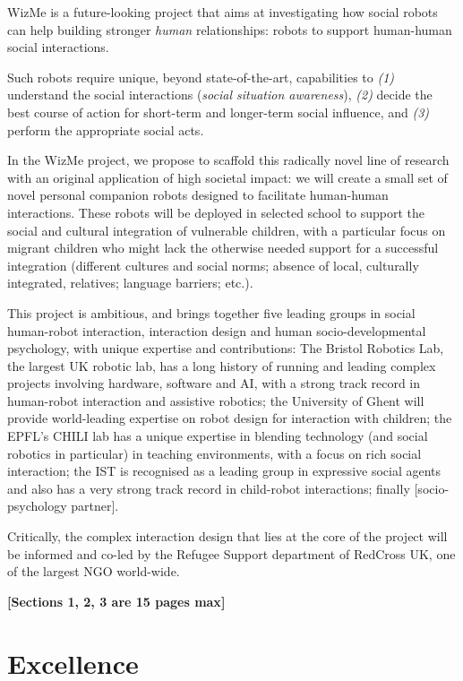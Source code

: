 \documentclass[]{article}
\begin{document}
WizMe is a future-looking project that aims at investigating how social
robots can help building stronger \emph{human} relationships: robots to
support human-human social interactions.

Such robots require unique, beyond state-of-the-art, capabilities to
\emph{(1)} understand the social interactions (\emph{social situation
awareness}), \emph{(2)} decide the best course of action for short-term
and longer-term social influence, and \emph{(3)} perform the appropriate
social acts.

In the WizMe project, we propose to scaffold this radically novel line
of research with an original application of high societal impact: we
will create a small set of novel personal companion robots designed to
facilitate human-human interactions. These robots will be deployed in
selected school to support the social and cultural integration of
vulnerable children, with a particular focus on migrant children who
might lack the otherwise needed support for a successful integration
(different cultures and social norms; absence of local, culturally
integrated, relatives; language barriers; etc.).

This project is ambitious, and brings together five leading groups in
social human-robot interaction, interaction design and human
socio-developmental psychology, with unique expertise and contributions:
The Bristol Robotics Lab, the largest UK robotic lab, has a long history
of running and leading complex projects involving hardware, software and
AI, with a strong track record in human-robot interaction and assistive
robotics; the University of Ghent will provide world-leading expertise
on robot design for interaction with children; the EPFL's CHILI lab has
a unique expertise in blending technology (and social robotics in
particular) in teaching environments, with a focus on rich social
interaction; the IST is recognised as a leading group in expressive
social agents and also has a very strong track record in child-robot
interactions; finally {[}socio-psychology partner{]}.

Critically, the complex interaction design that lies at the core of the
project will be informed and co-led by the Refugee Support department of
RedCross UK, one of the largest NGO world-wide.

\pagebreak

\textbf{{[}Sections 1, 2, 3 are 15 pages max{]}}

\section{Excellence}\label{excellence}
\end{document}
